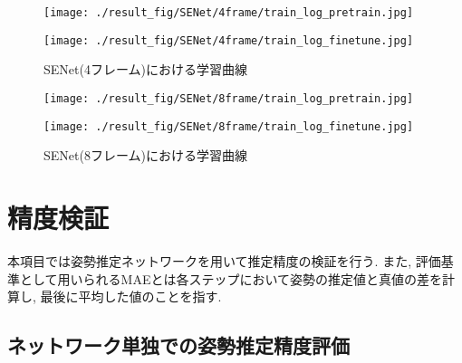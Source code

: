\begin{figure}[htbp]
  \begin{minipage}[b]{0.5\linewidth}
    \centering
    \texttt{[image: ./result\_fig/SENet/4frame/train\_log\_pretrain.jpg]}
  \end{minipage}
  \begin{minipage}[b]{0.5\linewidth}
    \centering
    \texttt{[image: ./result\_fig/SENet/4frame/train\_log\_finetune.jpg]}
  \end{minipage}
  \caption{SENet(4フレーム)における学習曲線}
\end{figure}

\begin{figure}[htbp]
  \begin{minipage}[b]{0.5\linewidth}
    \centering
    \texttt{[image: ./result\_fig/SENet/8frame/train\_log\_pretrain.jpg]}
  \end{minipage}
  \begin{minipage}[b]{0.5\linewidth}
    \centering
    \texttt{[image: ./result\_fig/SENet/8frame/train\_log\_finetune.jpg]}
  \end{minipage}
  \caption{SENet(8フレーム)における学習曲線}\label{fig:SENet_8frame}
\end{figure}

\newpage
\section{精度検証}\label{sec:verify}
本項目では姿勢推定ネットワークを用いて推定精度の検証を行う. また, 評価基準として用いられるMAEとは各ステップにおいて姿勢の推定値と真値の差を計算し, 最後に平均した値のことを指す.

\subsection{ネットワーク単独での姿勢推定精度評価}\label{sec:Verify_MAE_Network}


